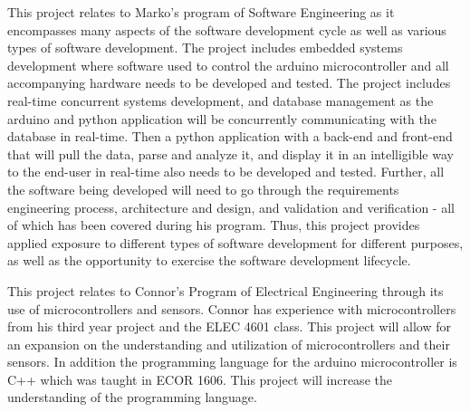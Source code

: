 This project relates to Marko’s program of Software Engineering as it encompasses many aspects of the software development cycle as well as various types of software development. The project includes embedded systems development where software used to control the arduino microcontroller and all accompanying hardware needs to be developed and tested. The project includes real-time concurrent systems development, and database management  as the arduino and python application will be concurrently communicating with the database in real-time. Then a python application with a back-end and front-end that will pull the data, parse and analyze it, and display it in an intelligible way to the end-user in real-time also needs to be developed and tested. Further, all the software being developed will need to go through the requirements engineering process, architecture and design, and validation and verification - all of which has been covered during his program.  Thus, this project provides applied exposure to different types of software development for different purposes, as well as the opportunity to exercise the software development lifecycle.

This project relates to Connor’s Program of Electrical Engineering through its use of microcontrollers and sensors. Connor has experience with microcontrollers from his third year project and the ELEC 4601 class. This project will allow for an expansion on the understanding and utilization of microcontrollers and their sensors. In addition the programming language for the arduino microcontroller is C++ which was taught in ECOR 1606. This project will increase the understanding of the programming language.
